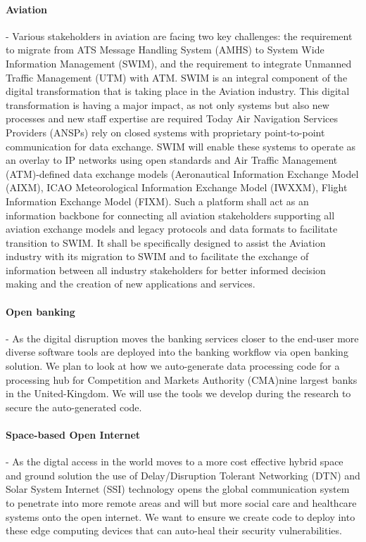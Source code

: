 \documentclass[a4paper,11pt]{article}
\begin{document}
\paragraph{Aviation}
\label{sec:swim}
- Various stakeholders in aviation are facing two key challenges: the requirement to migrate from ATS Message Handling System (AMHS) to System Wide Information Management (SWIM), and the requirement to integrate Unmanned Traffic Management (UTM) with ATM. SWIM is an integral component of the digital transformation that is taking place in the Aviation industry. This digital transformation is having a major impact, as not only systems but also new processes and new staff expertise are required Today Air Navigation Services Providers (ANSPs) rely on closed systems with proprietary point-to-point communication for data exchange. SWIM will enable these systems to operate as an overlay to IP networks using open standards and Air Traffic Management (ATM)-defined data exchange models (Aeronautical Information Exchange Model (AIXM), ICAO Meteorological Information Exchange Model (IWXXM), Flight Information Exchange Model (FIXM). 
Such a platform shall act as an information backbone for connecting all aviation stakeholders supporting all aviation exchange models and legacy protocols and data formats to facilitate transition to SWIM. It shall be specifically designed to assist the Aviation industry with its migration to SWIM and to facilitate the exchange of information between all industry stakeholders for better informed decision making and the creation of new applications and services.

\paragraph{Open banking}
\label{sec:banking}
- As the digital disruption moves the banking services closer to the end-user more diverse software tools are deployed into the banking workflow via open banking solution. We plan to look at how we auto-generate data processing code for a processing hub for Competition and Markets Authority (CMA)nine largest banks in the United-Kingdom. We will use the tools we develop during the research to secure the auto-generated code.

\paragraph{Space-based Open Internet}
\label{sec:spacenet}
- As the digtal access in the world moves to a more cost effective hybrid space and ground solution the use of Delay/Disruption Tolerant Networking (DTN) and Solar System Internet (SSI) technology opens the global communication system to penetrate into more remote areas and will but more social care and healthcare systems onto the open internet. We want to ensure we create code to deploy into these edge computing devices that can auto-heal their security vulnerabilities.
\end{document}
